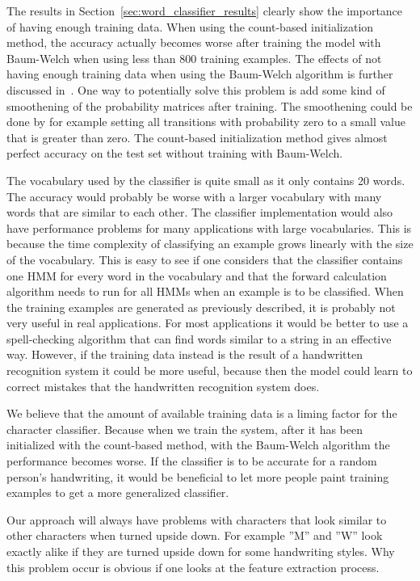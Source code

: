 The results in Section~\ref{sec:word_classifier_results} clearly show the importance of having enough training data.
When using the count-based initialization method, the accuracy actually becomes worse after training the model with Baum-Welch when using less than 800 training examples.
The effects of not having enough training data when using the Baum-Welch algorithm is further discussed in~\cite{Rabiner1989}.
One way to potentially solve this problem is add some kind of smoothening of the probability matrices after training.
The smoothening could be done by for example setting all transitions with probability zero to a small value that is greater than zero.
The count-based initialization method gives almost perfect accuracy on the test set without training with Baum-Welch.

The vocabulary used by the classifier is quite small as it only contains 20 words.
The accuracy would probably be worse with a larger vocabulary with many words that are similar to each other.
The classifier implementation would also have performance problems for many applications with large vocabularies.
This is because the time complexity of classifying an example grows linearly with the size of the vocabulary.
This is easy to see if one considers that the classifier contains one HMM for every word in the vocabulary and that the forward calculation algorithm needs to run for all HMMs when an example is to be classified.
When the training examples are generated as previously described, it is probably not very useful in real applications.
For most applications it would be better to use a spell-checking algorithm that can find words similar to a string in an effective way.
However, if the training data instead is the result of a handwritten recognition system it could be more useful, because then the model could learn to correct mistakes that the handwritten recognition system does.

We believe that the amount of available training data is a liming factor for the character classifier.
Because when we train the system, after it has been initialized with the count-based method, with the Baum-Welch algorithm the performance becomes worse.
If the classifier is to be accurate for a random person's handwriting, it would be beneficial to let more people paint training examples to get a more generalized classifier.

Our approach will always have problems with characters that look similar to other characters when turned upside down.
For example ''M'' and ''W'' look exactly alike if they are turned upside down for some handwriting styles.
Why this problem occur is obvious if one looks at the feature extraction process.
